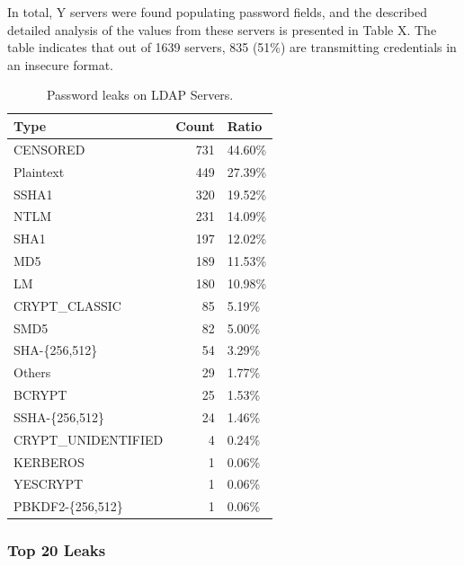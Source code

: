 In total, Y servers were found populating password fields, and the described detailed analysis of the values from these servers is presented in Table X. The table indicates that out of 1639 servers, 835 (51\%) are transmitting credentials in an insecure format.

\begin{table}
\begin{center}
\begin{tabularx}{0.45\textwidth}{|l|r|X|}
\hline
\textbf{Type} & \textbf{Count} & \textbf{Ratio} \\
\hline
\hline
CENSORED & 731 & 44.60\% \\
Plaintext & 449 & 27.39\% \\
SSHA1 & 320 & 19.52\% \\
NTLM & 231 & 14.09\% \\
SHA1 & 197 & 12.02\% \\
MD5 & 189 & 11.53\% \\
LM & 180 & 10.98\% \\
CRYPT\_CLASSIC & 85 & 5.19\% \\
SMD5 & 82 & 5.00\% \\
SHA-\{256,512\} & 54 & 3.29\% \\
Others & 29 & 1.77\% \\
BCRYPT & 25 & 1.53\% \\
SSHA-\{256,512\} & 24 & 1.46\% \\
CRYPT\_UNIDENTIFIED & 4 & 0.24\% \\
KERBEROS & 1 & 0.06\% \\
YESCRYPT & 1 & 0.06\% \\
PBKDF2-\{256,512\} & 1 & 0.06\% \\
\hline
\end{tabularx}
\end{center}
\caption{Password leaks on LDAP Servers.}
\label{tab:Password leaks on LDAP Servers.}
\end{table}

\subsubsection{Top 20 Leaks}


